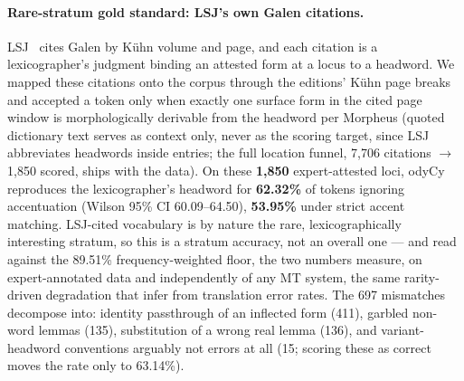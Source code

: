 \documentclass[11pt]{article}
\begin{document}
\paragraph{Rare-stratum gold standard: LSJ's own Galen citations.}
LSJ~\citep{lsj-perseus} cites Galen by K\"uhn volume and page, and each citation is a
lexicographer's judgment binding an attested form at a locus to a headword. We mapped these
citations onto the corpus through the editions' K\"uhn page breaks and accepted a token only when
exactly one surface form in the cited page window is morphologically derivable from the headword per
Morpheus (quoted dictionary text serves as context only, never as the scoring target, since LSJ
abbreviates headwords inside entries; the full location funnel, 7{,}706 citations $\rightarrow$
1{,}850 scored, ships with the data). On these \textbf{1{,}850} expert-attested loci, odyCy
reproduces the lexicographer's headword for \textbf{62.32\%} of tokens ignoring accentuation (Wilson
95\% CI 60.09--64.50), \textbf{53.95\%} under strict accent matching. LSJ-cited vocabulary is by
nature the rare, lexicographically interesting stratum, so this is a stratum accuracy, not an
overall one --- and read against the 89.51\% frequency-weighted floor, the two numbers measure, on
expert-annotated data and independently of any MT system, the same rarity-driven degradation that
\citet{galen-mt-mqm-2026} infer from translation error rates. The 697 mismatches decompose into:
identity passthrough of an inflected form (411), garbled non-word lemmas (135), substitution of a
wrong real lemma (136), and variant-headword conventions arguably not errors at all (15; scoring
these as correct moves the rate only to 63.14\%).
\end{document}
